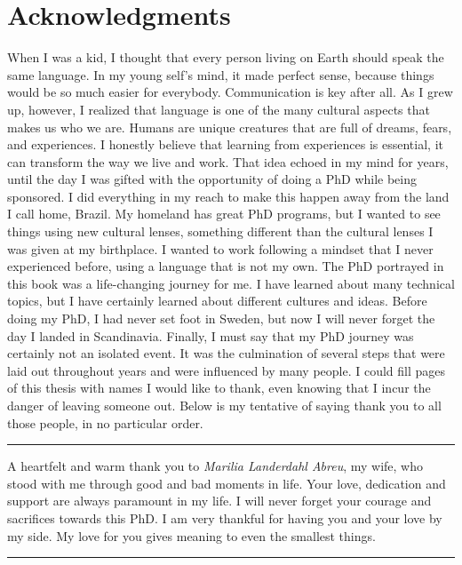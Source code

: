 \chapter*{Acknowledgments}

When I was a kid, I thought that every person living on Earth should speak the same language. In my young self's mind, it made perfect sense, because things would be so much easier for everybody. Communication is key after all. As I grew up, however, I realized that language is one of the many cultural aspects that makes us who we are. Humans are unique creatures that are full of dreams, fears, and experiences. I honestly believe that learning from experiences is essential, it can transform the way we live and work. That idea echoed in my mind for years, until the day I was gifted with the opportunity of doing a PhD while being sponsored. I did everything in my reach to make this happen away from the land I call home, Brazil. My homeland has great PhD programs, but I wanted to see things using new cultural lenses, something different than the cultural lenses I was given at my birthplace. I wanted to work following a mindset that I never experienced before, using a language that is not my own. The PhD portrayed in this book was a life-changing journey for me. I have learned about many technical topics, but I have certainly learned about different cultures and ideas. Before doing my PhD, I had never set foot in Sweden, but now I will never forget the day I landed in Scandinavia. Finally, I must say that my PhD journey was certainly not an isolated event. It was the culmination of several steps that were laid out throughout years and were influenced by many people. I could fill pages of this thesis with names I would like to thank, even knowing that I incur the danger of leaving someone out. Below is my tentative of saying thank you to all those people, in no particular order.

\vspace{7pt}\hrule\vspace{5pt}

A heartfelt and warm thank you to \textit{Marilia Landerdahl Abreu}, my wife, who stood with me through good and bad moments in life. Your love, dedication and support are always paramount in my life. I will never forget your courage and sacrifices towards this PhD. I am very thankful for having you and your love by my side. My love for you gives meaning to even the smallest things.

\vspace{7pt}\hrule\vspace{5pt}

